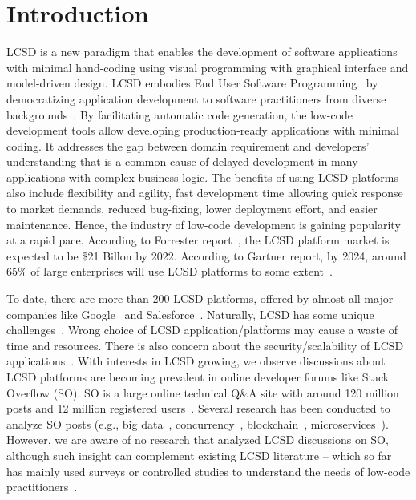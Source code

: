 \section{Introduction}
LCSD is a new paradigm that enables the development of
software applications with minimal hand-coding using visual programming with
graphical interface and model-driven design. LCSD embodies End User Software Programming~\cite{Pane-MoreNatureEUSE-Springer2006} by 
democratizing application development to software practitioners from diverse backgrounds~\cite{di2020democratizing}.  
By facilitating automatic code
generation, the low-code development tools allow developing production-ready applications with minimal coding. It
addresses the gap between domain requirement and developers' understanding that
is a common cause of delayed development in many applications with complex
business logic. The benefits of using  LCSD platforms
also include flexibility and agility, fast development time allowing
quick response to market demands, reduced bug-fixing, lower deployment effort,
and easier maintenance. Hence, the industry of low-code development is gaining
popularity at a rapid pace. According to Forrester
report~\cite{rymer2019forrester}, the  LCSD platform market is expected to be \$21 Billon by
2022. According to Gartner report, by 2024, around 65\% of
large enterprises will use  LCSD platforms to some extent~\cite{wong2019low}.

To date, there are more than 200  LCSD platforms, offered by almost all major companies like Google~\cite{googleappmaker} and Salesforce~\cite{salesforce}. 
Naturally,  LCSD has some unique challenges~\cite{sahay2020supporting}. Wrong
choice of  LCSD application/platforms may cause a waste of
time and resources. There is also concern about the security/scalability of
 LCSD applications~\cite{lowcodetesting}. With interests in  LCSD growing, we observe discussions about  LCSD platforms are becoming prevalent in online developer forums like Stack Overflow (SO). SO is a large online technical Q\&A site with
around 120 million posts and 12 million registered users~\cite{website:stackoverflow}. Several research has been conducted to
analyze SO posts (e.g., big
data~\cite{bagherzadeh2019going}, concurrency~\cite{ahmed2018concurrency}, blockchain~\cite{wan2019discussed}, microservices~\cite{bandeira2019we}). However, we are aware of no
research that analyzed  LCSD discussions on SO, 
although such insight can complement existing  LCSD literature -- which so far has mainly used surveys or controlled studies to understand the needs of low-code practitioners~\cite{lowcodeapp,kourouklidis2020towards,alonso2020towards,lowcodetesting}.  

